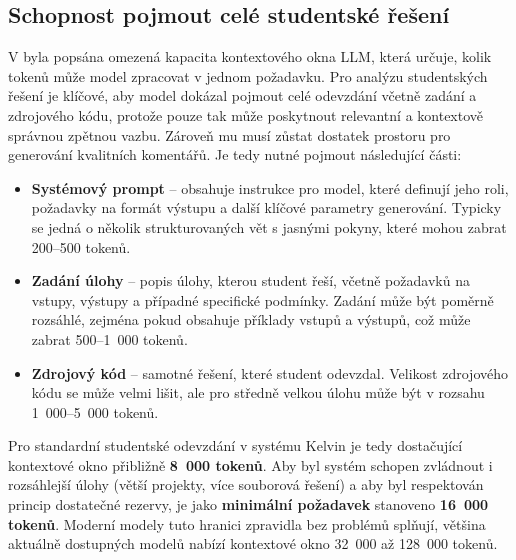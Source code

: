 \subsection{Schopnost pojmout celé studentské řešení}
\label{subsec:criteria-context-window}

V  byla popsána omezená kapacita kontextového okna LLM, která určuje, kolik tokenů může model zpracovat v jednom požadavku.
Pro analýzu studentských řešení je klíčové, aby model dokázal pojmout celé odevzdání včetně zadání a zdrojového kódu, protože pouze tak může poskytnout relevantní a kontextově správnou zpětnou vazbu.
Zároveň mu musí zůstat dostatek prostoru pro generování kvalitních komentářů.
Je tedy nutné pojmout následující části:

\begin{itemize}
    \item \textbf{Systémový prompt} -- obsahuje instrukce pro model, které definují jeho roli, požadavky na formát výstupu a další klíčové parametry generování.
    Typicky se jedná o několik strukturovaných vět s jasnými pokyny, které mohou zabrat 200--500 tokenů.

    \item \textbf{Zadání úlohy} -- popis úlohy, kterou student řeší, včetně požadavků na vstupy, výstupy a případné specifické podmínky.
    Zadání může být poměrně rozsáhlé, zejména pokud obsahuje příklady vstupů a výstupů, což může zabrat 500--1~000 tokenů.

    \item \textbf{Zdrojový kód} -- samotné řešení, které student odevzdal.
    Velikost zdrojového kódu se může velmi lišit, ale pro středně velkou úlohu může být v rozsahu 1~000--5~000 tokenů.
\end{itemize}

Pro standardní studentské odevzdání v systému Kelvin je tedy dostačující kontextové okno přibližně \textbf{8~000 tokenů}.
Aby byl systém schopen zvládnout i rozsáhlejší úlohy (větší projekty, více souborová řešení) a aby byl respektován princip dostatečné rezervy, je jako \textbf{minimální požadavek} stanoveno \textbf{16~000 tokenů}.
Moderní modely tuto hranici zpravidla bez problémů splňují, většina aktuálně dostupných modelů nabízí kontextové okno 32~000 až 128~000 tokenů.


